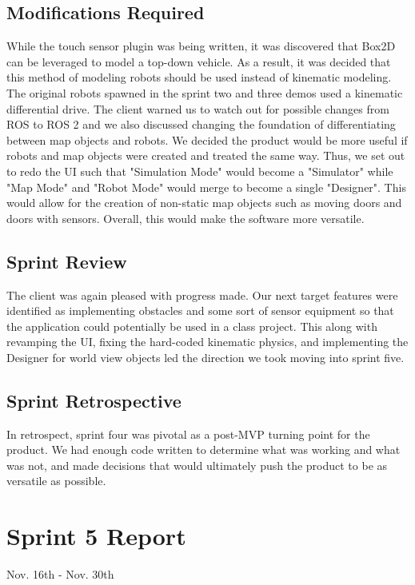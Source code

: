 \subsection{Modifications Required}

While the touch sensor plugin was being written, it was discovered that Box2D can be leveraged to model a top-down vehicle. As a result, it was decided that this method of modeling robots should be used instead of kinematic modeling. The original robots spawned in the sprint two and three demos used a kinematic differential drive. The client warned us to watch out for possible changes from ROS to ROS 2 and we also discussed changing the foundation of differentiating between map objects and robots. We decided the product would be more useful if robots and map objects were created and treated the same way. Thus, we set out to redo the UI such that "Simulation Mode" would become a "Simulator" while "Map Mode" and "Robot Mode" would merge to become a single "Designer". This would allow for the creation of non-static map objects such as moving doors and doors with sensors. Overall, this would make the software more versatile.

\subsection{Sprint Review}

The client was again pleased with progress made. Our next target features were identified as implementing obstacles and some sort of sensor equipment so that the application could potentially be used in a class project. This along with revamping the UI, fixing the hard-coded kinematic physics, and implementing the Designer for world view objects led the direction we took moving into sprint five.

\subsection{Sprint Retrospective}

In retrospect, sprint four was pivotal as a post-MVP turning point for the product. We had enough code written to determine what was working and what was not, and made decisions that would ultimately push the product to be as versatile as possible.


\section{Sprint 5 Report}
Nov. 16th - Nov. 30th

